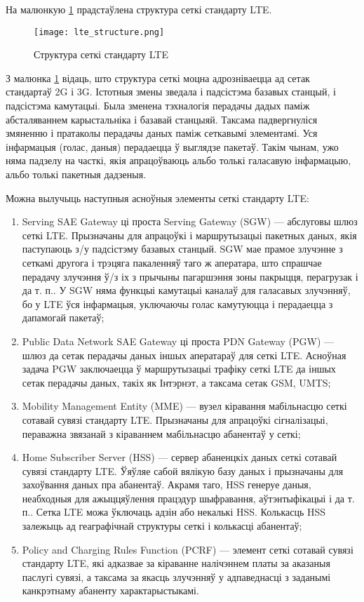 На малюнкую \ref{figure: LTE structure} прадстаўлена структура
сеткі стандарту LTE.

\newpage

\begin{figure}[h!]
    \centering
    \texttt{[image: lte\_structure.png]}
    \caption{Структура сеткі стандарту LTE}
    \label{figure: LTE structure}
\end{figure}

З малюнка \ref{figure: LTE structure} відаць, што структура сеткі моцна адрозніваецца ад сетак стандартаў 2G і 3G. Істотныя змены зведала і падсістэма базавых станцый, і падсістэма камутацыі. Была зменена тэхналогія перадачы дадых паміж абсталяваннем карыстальніка і базавай станцыяй. Таксама падвергнуліся змяненню і пратаколы перадачы даных паміж сеткавымі элементамі. Уся інфармацыя (голас, даныя) перадаецца ў выглядзе пакетаў. Такім чынам, ужо няма падзелу на часткі, якія  апрацоўваюць альбо толькі галасавую інфармацыю, альбо толькі пакетныя дадзеныя.

Можна вылучыць наступныя асноўныя элементы сеткі стандарту LTE:
\begin{enumerate}
    \item Serving SAE Gateway ці проста Serving Gateway (SGW) --- абслуговы шлюз сеткі LTE. Прызначаны для апрацоўкі і маршрутызацыі пакетных даных, якія паступаюць з/у падсістэму базавых станцый. SGW мае прамое злучэнне з сеткамі другога і трэцяга пакаленняў таго ж аператара, што спрашчае перадачу злучэння ў/з іх з прычыны пагаршэння зоны пакрыцця, перагрузак і да т. п.. У SGW няма функцыі камутацыі каналаў для галасавых злучэнняў, бо у LTE ўся інфармацыя, уключаючы голас камутуюцца і перадаецца з дапамогай пакетаў;
    \item Public Data Network SAE Gateway ці проста PDN Gateway (PGW) --- шлюз да сетак перадачы даных іншых аператараў для сеткі LTE. Асноўная задача PGW заключаецца ў маршрутызацыі трафіку сеткі LTE да іншых сетак перадачы даных, такіх як Інтэрнэт, а таксама сетак GSM, UMTS;
    \item Mobility Management Entity (MME) --- вузел кіравання мабільнасцю сеткі сотавай сувязі стандарту LTE. Прызначаны для апрацоўкі сігналізацыі, пераважна звязанай з кіраваннем мабільнасцю абанентаў у сеткі;
    \item Home Subscriber Server (HSS) --- сервер абаненцкіх даных сеткі сотавай сувязі стандарту LTE. Ўяўляе сабой вялікую базу даных і прызначаны для захоўвання даных пра абанентаў. Акрамя таго, HSS генеруе даныя, неабходныя для ажыццяўлення працэдур шыфравання, аўтэнтыфікацыі і да т. п.. Сетка LTE можа ўключаць адзін або некалькі HSS. Колькасць HSS залежыць ад геаграфічнай структуры сеткі і колькасці абанентаў;
    \item Policy and Charging Rules Function (PCRF) --- элемент сеткі сотавай сувязі стандарту LTE, які адказвае за кіраванне налічэннем платы за аказаныя паслугі сувязі, а таксама за якасць злучэнняў у адпаведнасці з заданымі канкрэтнаму абаненту характарыстыкамі.
\end{enumerate}

